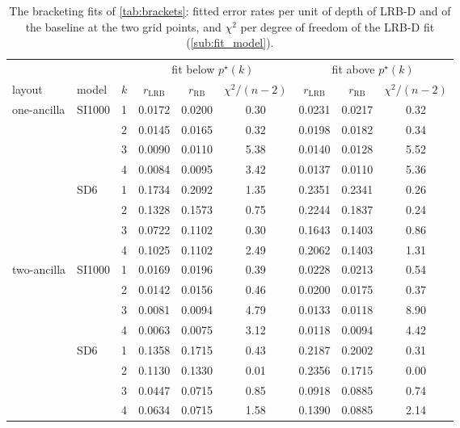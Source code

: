 \begin{table}[tp]
  \centering
  \footnotesize
  \setlength{\tabcolsep}{4pt}
  \begin{tabular}{llc|ccc|ccc}
    \hline
    & & & \multicolumn{3}{c|}{fit below $p^\star(k)$} & \multicolumn{3}{c}{fit above $p^\star(k)$} \\
    layout & model & $k$ & $r_{\mathrm{LRB}}$ & $r_{\mathrm{RB}}$ & $\chi^2/(n-2)$ & $r_{\mathrm{LRB}}$ & $r_{\mathrm{RB}}$ & $\chi^2/(n-2)$ \\
    \hline
    one-ancilla & SI1000 & 1 & 0.0172 & 0.0200 & 0.30 & 0.0231 & 0.0217 & 0.32 \\
     &  & 2 & 0.0145 & 0.0165 & 0.32 & 0.0198 & 0.0182 & 0.34 \\
     &  & 3 & 0.0090 & 0.0110 & 5.38 & 0.0140 & 0.0128 & 5.52 \\
     &  & 4 & 0.0084 & 0.0095 & 3.42 & 0.0137 & 0.0110 & 5.36 \\
    \hline
     & SD6 & 1 & 0.1734 & 0.2092 & 1.35 & 0.2351 & 0.2341 & 0.26 \\
     &  & 2 & 0.1328 & 0.1573 & 0.75 & 0.2244 & 0.1837 & 0.24 \\
     &  & 3 & 0.0722 & 0.1102 & 0.30 & 0.1643 & 0.1403 & 0.86 \\
     &  & 4 & 0.1025 & 0.1102 & 2.49 & 0.2062 & 0.1403 & 1.31 \\
    \hline
    two-ancilla & SI1000 & 1 & 0.0169 & 0.0196 & 0.39 & 0.0228 & 0.0213 & 0.54 \\
     &  & 2 & 0.0142 & 0.0156 & 0.46 & 0.0200 & 0.0175 & 0.37 \\
     &  & 3 & 0.0081 & 0.0094 & 4.79 & 0.0133 & 0.0118 & 8.90 \\
     &  & 4 & 0.0063 & 0.0075 & 3.12 & 0.0118 & 0.0094 & 4.42 \\
    \hline
     & SD6 & 1 & 0.1358 & 0.1715 & 0.43 & 0.2187 & 0.2002 & 0.31 \\
     &  & 2 & 0.1130 & 0.1330 & 0.01 & 0.2356 & 0.1715 & 0.00 \\
     &  & 3 & 0.0447 & 0.0715 & 0.85 & 0.0918 & 0.0885 & 0.74 \\
     &  & 4 & 0.0634 & 0.0715 & 1.58 & 0.1390 & 0.0885 & 2.14 \\
    \hline
  \end{tabular}
  \caption{The bracketing fits of \autoref{tab:brackets}: fitted error rates per unit of depth of LRB-D and of the baseline at the two grid points, and $\chi^2$ per degree of freedom of the LRB-D fit (\autoref{sub:fit_model}).}
  \label{tab:brackets_rates}
\end{table}


